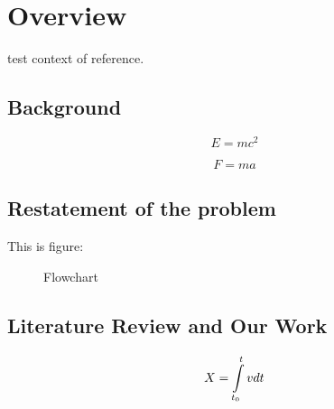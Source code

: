 
\section{Overview}

test context of reference\cite{zynq}.

\subsection{Background}

\begin{equation}
E=mc^{2}
\end{equation}

\begin{equation}
F=ma
\end{equation}


\subsection{Restatement of the problem}

This is figure:

\begin{figure}


\caption{Flowchart}

\end{figure}


\subsection{Literature Review and Our Work}

\begin{equation}
X=\intop_{t_{0}}^{t}vdt
\end{equation}

